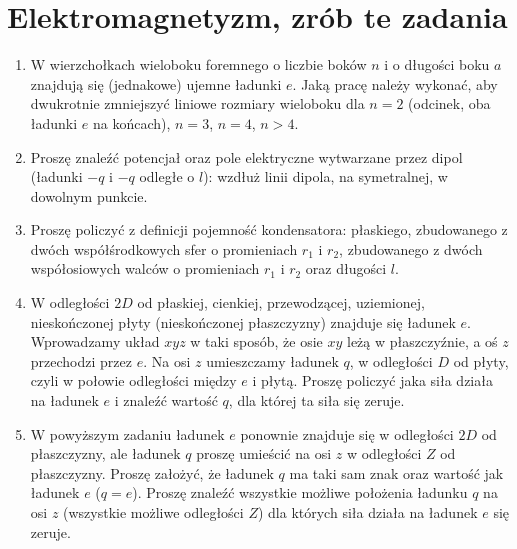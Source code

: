 \documentclass[a4paper,11pt]{article}
\begin{document}
\section{Elektromagnetyzm, zrób te zadania}





\begin{enumerate}

\item W wierzchołkach wieloboku foremnego o liczbie boków $n$ i o
  długości boku $a$ znajdują się (jednakowe) ujemne ładunki $e$. Jaką
  pracę należy wykonać, aby dwukrotnie zmniejszyć liniowe rozmiary
  wieloboku dla $n = 2$ (odcinek, oba ładunki $e$ na końcach),
  $n = 3$, $n = 4$, $n > 4$.

\item Proszę znaleźć potencjał oraz pole elektryczne wytwarzane przez
  dipol (ładunki $-q$ i $-q$ odległe o $l$): wzdłuż linii dipola, na
  symetralnej, w dowolnym punkcie.

\item Proszę policzyć z definicji pojemność kondensatora: płaskiego,
  zbudowanego z dwóch współśrodkowych sfer o promieniach $r_{ 1 }$ i
  $r_{ 2 }$, zbudowanego z dwóch współosiowych walców o promieniach
  $r_{ 1 }$ i $r_{ 2 }$ oraz długości $l$.

\item W odległości $2D$ od płaskiej, cienkiej, przewodzącej,
  uziemionej, nieskończonej płyty (nieskończonej płaszczyzny) znajduje
  się ładunek $e$. Wprowadzamy układ $xyz$ w taki sposób, że osie $xy$
  leżą w płaszczyźnie, a oś $z$ przechodzi przez $e$. Na osi $z$
  umieszczamy ładunek $q$, w odległości $D$ od płyty, czyli w połowie
  odległości między $e$ i płytą. Proszę policzyć jaka siła działa na
  ładunek $e$ i znaleźć wartość $q$, dla której ta siła się zeruje.

\item W powyższym zadaniu ładunek $e$ ponownie znajduje się w
  odległości $2D$ od płaszczyzny, ale ładunek $q$ proszę umieścić na
  osi $z$ w odległości $Z$ od płaszczyzny. Proszę założyć, że ładunek
  $q$ ma taki sam znak oraz wartość jak ładunek $e$ ($q = e$). Proszę
  znaleźć wszystkie możliwe położenia ładunku $q$ na osi $z$
  (wszystkie możliwe odległości $Z$) dla których siła działa na
  ładunek $e$ się zeruje.


\end{enumerate}
\end{document}

